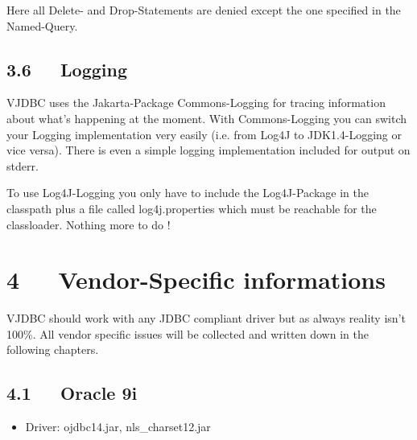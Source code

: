 \documentclass[10pt,a4paper,english]{article}
\begin{document}
Here all Delete- and Drop-Statements are denied except the one specified in the Named-Query.



\hypertarget{logging}{}
\subsection*{3.6~~~Logging}

VJDBC uses the Jakarta-Package Commons-Logging for tracing information about what's happening at the moment. With Commons-Logging you can switch your Logging implementation very easily (i.e. from Log4J to JDK1.4-Logging or vice versa). There is even a simple logging implementation included for output on stderr.

To use Log4J-Logging you only have to include the Log4J-Package in the classpath plus a file called log4j.properties which must be reachable for the classloader. Nothing more to do !



\hypertarget{vendor-specific-informations}{}
\section*{4~~~Vendor-Specific informations}

VJDBC should work with any JDBC compliant driver but as always reality isn't 100{\%}. All vendor specific issues will be collected and written down in the following chapters.



\hypertarget{oracle-9i}{}
\subsection*{4.1~~~Oracle 9i}
\begin{itemize}
\item {} 
Driver: ojdbc14.jar, nls{\_}charset12.jar

\end{itemize}
\end{document}
